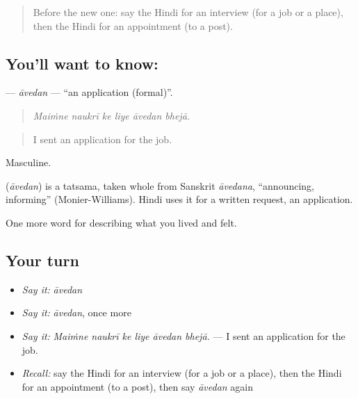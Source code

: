 \label{lesson:HI-C508-avedan}



\begin{quote}
Before the new one: say the Hindi for an interview (for a job or a place), then the Hindi for an appointment (to a post).
\end{quote}

\subsection*{You'll want to know: }
\textbf{} — \emph{āvedan} — \textquotedblleft{}an application (formal)\textquotedblright{}.

\begin{quote}
     
\end{quote}

\begin{quote}
\emph{Maiṁne naukrī ke liye āvedan bhejā.}
\end{quote}

\begin{quote}
I sent an application for the job.
\end{quote}

Masculine.

\begin{cousinweb}
\textbf{} (\emph{āvedan}) is a tatsama, taken whole from Sanskrit \emph{āvedana}, \textquotedblleft{}announcing, informing\textquotedblright{} (Monier-Williams). Hindi uses it for a written request, an application.
\end{cousinweb}

\begin{grammarlens}[title={What you've built}]
One more word for describing what you lived and felt.
\end{grammarlens}

\subsection*{Your turn}
\begin{itemize}
\raggedright
  \item \emph{Say it:} \emph{āvedan}
  \item \emph{Say it:} \emph{āvedan}, once more
  \item \emph{Say it:} \emph{Maiṁne naukrī ke liye āvedan bhejā.} — I sent an application for the job.
  \item \emph{Recall:} say the Hindi for an interview (for a job or a place), then the Hindi for an appointment (to a post), then say \emph{āvedan} again
\end{itemize}

